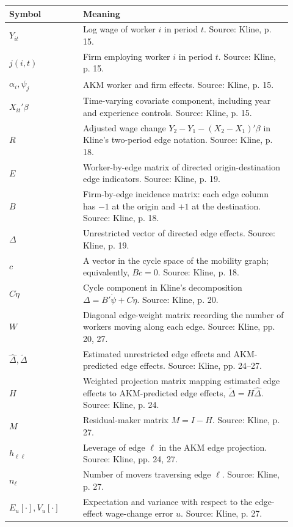 \documentclass[11pt]{article}
\begin{document}
\begin{center}
\begin{tabular}{>{\raggedright\arraybackslash}p{0.24\linewidth}
                >{\raggedright\arraybackslash}p{0.68\linewidth}}
\toprule
Symbol & Meaning \\
\midrule
$Y_{it}$ & Log wage of worker $i$ in period $t$. Source: Kline, p. 15. \\
$j(i,t)$ & Firm employing worker $i$ in period $t$. Source: Kline, p. 15. \\
$\alpha_i,\psi_j$ & AKM worker and firm effects. Source: Kline, p. 15. \\
$X_{it}'\beta$ & Time-varying covariate component, including year and experience controls. Source: Kline, p. 15. \\
$R$ & Adjusted wage change $Y_2-Y_1-(X_2-X_1)'\beta$ in Kline's two-period edge notation. Source: Kline, p. 18. \\
$E$ & Worker-by-edge matrix of directed origin-destination edge indicators. Source: Kline, p. 19. \\
$B$ & Firm-by-edge incidence matrix: each edge column has $-1$ at the origin and $+1$ at the destination. Source: Kline, p. 18. \\
$\Delta$ & Unrestricted vector of directed edge effects. Source: Kline, p. 19. \\
$c$ & A vector in the cycle space of the mobility graph; equivalently, $Bc=0$. Source: Kline, p. 18. \\
$C\dot\eta$ & Cycle component in Kline's decomposition $\Delta=B'\dot\psi+C\dot\eta$. Source: Kline, p. 20. \\
$W$ & Diagonal edge-weight matrix recording the number of workers moving along each edge. Source: Kline, pp. 20, 27. \\
$\hat\Delta,\tilde\Delta$ & Estimated unrestricted edge effects and AKM-predicted edge effects. Source: Kline, pp. 24--27. \\
$H$ & Weighted projection matrix mapping estimated edge effects to AKM-predicted edge effects, $\tilde\Delta=H\hat\Delta$. Source: Kline, p. 24. \\
$M$ & Residual-maker matrix $M=I-H$. Source: Kline, p. 27. \\
$h_{\ell\ell}$ & Leverage of edge $\ell$ in the AKM edge projection. Source: Kline, pp. 24, 27. \\
$n_\ell$ & Number of movers traversing edge $\ell$. Source: Kline, p. 27. \\
$E_u[\cdot],V_u[\cdot]$ & Expectation and variance with respect to the edge-effect wage-change error $u$. Source: Kline, p. 27. \\
\bottomrule
\end{tabular}
\end{center}
\end{document}
